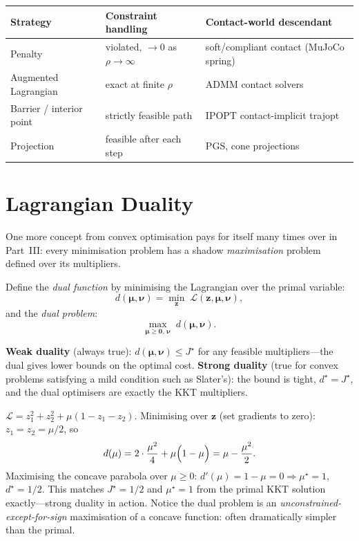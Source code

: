 \documentclass[11pt,twoside]{report}
\theoremstyle{definition}
\theoremstyle{plain}
\theoremstyle{remark}
\newcommand{\0}{\bm{0}}
\begin{document}
\begin{insightbox}
\begin{center}
\begin{tabular}{lll}
\toprule
\textbf{Strategy} & \textbf{Constraint handling} & \textbf{Contact-world descendant}\\
\midrule
Penalty & violated, $\to 0$ as $\rho\to\infty$ & soft/compliant contact (MuJoCo spring)\\
Augmented Lagrangian & exact at finite $\rho$ & ADMM contact solvers\\
Barrier / interior point & strictly feasible path & IPOPT contact-implicit trajopt\\
Projection & feasible after each step & PGS, cone projections\\
\bottomrule
\end{tabular}
\end{center}
\end{insightbox}

\section{Lagrangian Duality}
\label{sec:duality}

One more concept from convex optimisation pays for itself many times
over in Part~III: every minimisation problem has a shadow
\emph{maximisation} problem defined over its multipliers.

Define the \emph{dual function} by minimising the Lagrangian over the
primal variable:
\begin{equation}
d(\bm{\mu},\bm{\nu})=\min_{\bm{z}}\;\mathcal{L}(\bm{z},\bm{\mu},\bm{\nu}),
\end{equation}
and the \emph{dual problem}:
\begin{equation}\label{eq:dual-problem}
\max_{\bm{\mu}\ge\0,\,\bm{\nu}}\;d(\bm{\mu},\bm{\nu}).
\end{equation}

\textbf{Weak duality} (always true): $d(\bm{\mu},\bm{\nu})\le J^{\star}$
for any feasible multipliers---the dual gives lower bounds on the optimal
cost. \textbf{Strong duality} (true for convex problems satisfying a mild
condition such as Slater's): the bound is tight, $d^{\star}=J^{\star}$,
and the dual optimisers are exactly the KKT multipliers.

\begin{examplebox}
$\mathcal{L}=z_{1}^{2}+z_{2}^{2}+\mu(1-z_{1}-z_{2})$.
Minimising over $\bm{z}$ (set gradients to zero):
$z_{1}=z_{2}=\mu/2$, so
\begin{equation*}
d(\mu)=2\cdot\frac{\mu^{2}}{4}+\mu\Bigl(1-\mu\Bigr)
=\mu-\frac{\mu^{2}}{2}.
\end{equation*}
Maximising the concave parabola over $\mu\ge 0$:
$d'(\mu)=1-\mu=0\Rightarrow\mu^{\star}=1$, $d^{\star}=1/2$.
This matches $J^{\star}=1/2$ and $\mu^{\star}=1$ from the primal KKT
solution exactly---strong duality in action. Notice the dual problem is
an \emph{unconstrained-except-for-sign} maximisation of a concave
function: often dramatically simpler than the primal.
\end{examplebox}
\end{document}
